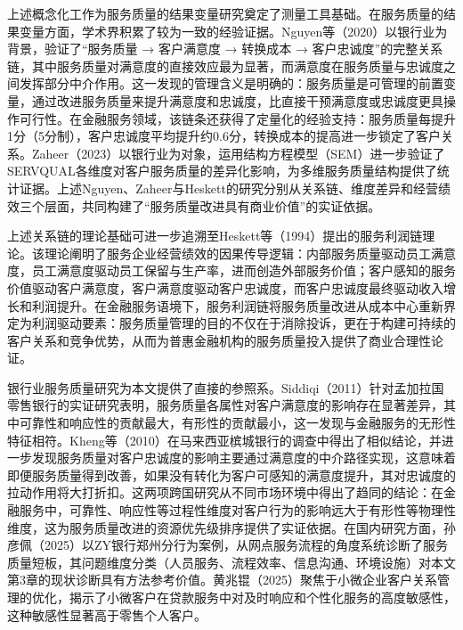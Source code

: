 上述概念化工作为服务质量的结果变量研究奠定了测量工具基础。在服务质量的结果变量方面，学术界积累了较为一致的经验证据。Nguyen等（2020）以银行业为背景，验证了“服务质量 → 客户满意度 → 转换成本 → 客户忠诚度”的完整关系链，其中服务质量对满意度的直接效应最为显著，而满意度在服务质量与忠诚度之间发挥部分中介作用\cite{ref31}。这一发现的管理含义是明确的：服务质量是可管理的前置变量，通过改进服务质量来提升满意度和忠诚度，比直接干预满意度或忠诚度更具操作可行性。在金融服务领域，该链条还获得了定量化的经验支持：服务质量每提升1分（5分制），客户忠诚度平均提升约0.6分，转换成本的提高进一步锁定了客户关系\cite{ref31}。Zaheer（2023）以银行业为对象，运用结构方程模型（SEM）进一步验证了SERVQUAL各维度对客户服务质量的差异化影响，为多维服务质量结构提供了统计证据\cite{ref32}。上述Nguyen、Zaheer与Heskett的研究分别从关系链、维度差异和经营绩效三个层面，共同构建了“服务质量改进具有商业价值”的实证依据。\par

上述关系链的理论基础可进一步追溯至Heskett等（1994）提出的服务利润链理论\cite{ref33}。该理论阐明了服务企业经营绩效的因果传导逻辑：内部服务质量驱动员工满意度，员工满意度驱动员工保留与生产率，进而创造外部服务价值；客户感知的服务价值驱动客户满意度，客户满意度驱动客户忠诚度，而客户忠诚度最终驱动收入增长和利润提升。在金融服务语境下，服务利润链将服务质量改进从成本中心重新界定为利润驱动要素：服务质量管理的目的不仅在于消除投诉，更在于构建可持续的客户关系和竞争优势，从而为普惠金融机构的服务质量投入提供了商业合理性论证。\par

银行业服务质量研究为本文提供了直接的参照系。Siddiqi（2011）针对孟加拉国零售银行的实证研究表明，服务质量各属性对客户满意度的影响存在显著差异，其中可靠性和响应性的贡献最大，有形性的贡献最小，这一发现与金融服务的无形性特征相符\cite{ref35}。Kheng等（2010）在马来西亚槟城银行的调查中得出了相似结论，并进一步发现服务质量对客户忠诚度的影响主要通过满意度的中介路径实现，这意味着即便服务质量得到改善，如果没有转化为客户可感知的满意度提升，其对忠诚度的拉动作用将大打折扣\cite{ref36}。这两项跨国研究从不同市场环境中得出了趋同的结论：在金融服务中，可靠性、响应性等过程性维度对客户行为的影响远大于有形性等物理性维度，这为服务质量改进的资源优先级排序提供了实证依据。在国内研究方面，孙彦佩（2025）以ZY银行郑州分行为案例，从网点服务流程的角度系统诊断了服务质量短板，其问题维度分类（人员服务、流程效率、信息沟通、环境设施）对本文第3章的现状诊断具有方法参考价值\cite{ref37}。黄兆锟（2025）聚焦于小微企业客户关系管理的优化，揭示了小微客户在贷款服务中对及时响应和个性化服务的高度敏感性，这种敏感性显著高于零售个人客户\cite{ref38}。\par

